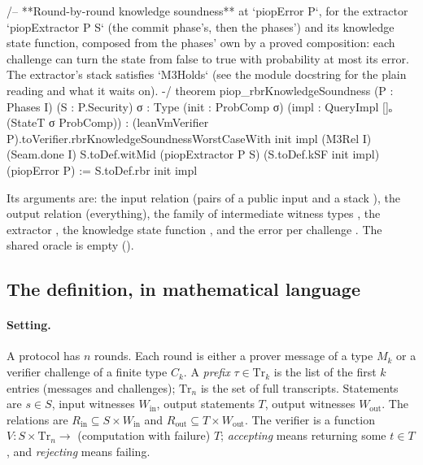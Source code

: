 \begin{leancode}
/-- **Round-by-round knowledge soundness** at `piopError P`, for the extractor
`piopExtractor P S` (the commit phase's, then the phases') and its knowledge state function,
composed from the phases' own by a proved composition: each challenge can turn the state from
false to true with probability at most its error. The extractor's stack satisfies `M3Holds` (see
the module docstring for the plain reading and what it waits on). -/
theorem piop_rbrKnowledgeSoundness (P : Phases I) (S : P.Security) {σ : Type}
    (init : ProbComp σ) (impl : QueryImpl []ₒ (StateT σ ProbComp)) :
    (leanVmVerifier P).toVerifier.rbrKnowledgeSoundnessWorstCaseWith init impl (M3Rel I)
      (Seam.done I) S.toDef.witMid (piopExtractor P S) (S.toDef.kSF init impl)
      (piopError P) :=
  S.toDef.rbr init impl
\end{leancode}


Its arguments are: the input relation  (pairs of a public input and a stack
), the output relation  (everything), the family of intermediate
witness types , the extractor , the knowledge state
function , and the error per challenge . The shared
oracle is empty ().

\subsection{The definition, in mathematical language}\label{sec:gen-lib-ark-definition}

\paragraph{Setting.} A protocol has $n$ rounds. Each round is either a prover message of a type
$M_k$ or a verifier challenge of a finite type $C_k$. A \emph{prefix} $\tau \in \mathrm{Tr}_k$ is
the list of the first $k$ entries (messages and challenges); $\mathrm{Tr}_n$ is the set of full
transcripts. Statements are $s \in S$, input witnesses $W_{\mathrm{in}}$, output statements $T$,
output witnesses $W_{\mathrm{out}}$. The relations are
$R_{\mathrm{in}} \subseteq S \times W_{\mathrm{in}}$ and
$R_{\mathrm{out}} \subseteq T \times W_{\mathrm{out}}$. The verifier is a function
$V : S \times \mathrm{Tr}_n \to$ (computation with failure) $T$; \emph{accepting} means returning
some $t \in T$, and \emph{rejecting} means failing.

